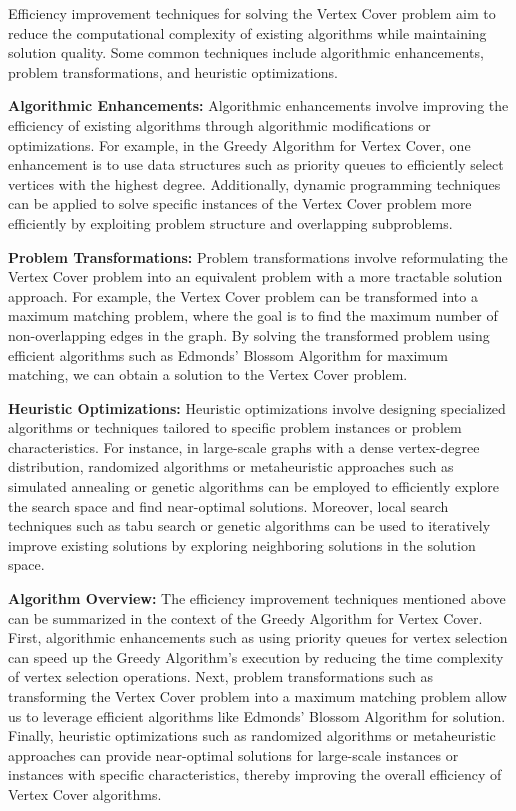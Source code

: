 \documentclass[12pt]{book} %
\begin{document}
Efficiency improvement techniques for solving the Vertex Cover problem aim to reduce the computational complexity of existing algorithms while maintaining solution quality. Some common techniques include algorithmic enhancements, problem transformations, and heuristic optimizations.

\textbf{Algorithmic Enhancements:} Algorithmic enhancements involve improving the efficiency of existing algorithms through algorithmic modifications or optimizations. For example, in the Greedy Algorithm for Vertex Cover, one enhancement is to use data structures such as priority queues to efficiently select vertices with the highest degree. Additionally, dynamic programming techniques can be applied to solve specific instances of the Vertex Cover problem more efficiently by exploiting problem structure and overlapping subproblems.

\textbf{Problem Transformations:} Problem transformations involve reformulating the Vertex Cover problem into an equivalent problem with a more tractable solution approach. For example, the Vertex Cover problem can be transformed into a maximum matching problem, where the goal is to find the maximum number of non-overlapping edges in the graph. By solving the transformed problem using efficient algorithms such as Edmonds' Blossom Algorithm for maximum matching, we can obtain a solution to the Vertex Cover problem.

\textbf{Heuristic Optimizations:} Heuristic optimizations involve designing specialized algorithms or techniques tailored to specific problem instances or problem characteristics. For instance, in large-scale graphs with a dense vertex-degree distribution, randomized algorithms or metaheuristic approaches such as simulated annealing or genetic algorithms can be employed to efficiently explore the search space and find near-optimal solutions. Moreover, local search techniques such as tabu search or genetic algorithms can be used to iteratively improve existing solutions by exploring neighboring solutions in the solution space.

\textbf{Algorithm Overview:} The efficiency improvement techniques mentioned above can be summarized in the context of the Greedy Algorithm for Vertex Cover. First, algorithmic enhancements such as using priority queues for vertex selection can speed up the Greedy Algorithm's execution by reducing the time complexity of vertex selection operations. Next, problem transformations such as transforming the Vertex Cover problem into a maximum matching problem allow us to leverage efficient algorithms like Edmonds' Blossom Algorithm for solution. Finally, heuristic optimizations such as randomized algorithms or metaheuristic approaches can provide near-optimal solutions for large-scale instances or instances with specific characteristics, thereby improving the overall efficiency of Vertex Cover algorithms.
\end{document}
